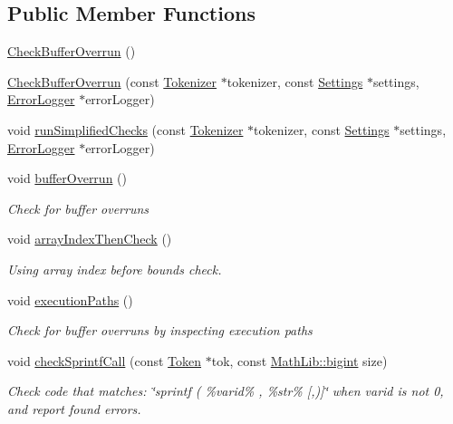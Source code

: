 \subsection*{Public Member Functions}
\begin{DoxyCompactItemize}
\item 
\hyperlink{class_check_buffer_overrun_a1cb967e46fe74a25d76e1eddf89e50a5}{Check\-Buffer\-Overrun} ()
\item 
\hyperlink{class_check_buffer_overrun_a31106cd3941647bd0064d2c7f60e7f6d}{Check\-Buffer\-Overrun} (const \hyperlink{class_tokenizer}{Tokenizer} $\ast$tokenizer, const \hyperlink{class_settings}{Settings} $\ast$settings, \hyperlink{class_error_logger}{Error\-Logger} $\ast$error\-Logger)
\item 
void \hyperlink{class_check_buffer_overrun_af0b26b559bda17a0403231d73756bd81}{run\-Simplified\-Checks} (const \hyperlink{class_tokenizer}{Tokenizer} $\ast$tokenizer, const \hyperlink{class_settings}{Settings} $\ast$settings, \hyperlink{class_error_logger}{Error\-Logger} $\ast$error\-Logger)
\item 
void \hyperlink{class_check_buffer_overrun_a610709cc6a78494f9d87074fae823554}{buffer\-Overrun} ()
\begin{DoxyCompactList}\small\item\em Check for buffer overruns \end{DoxyCompactList}\item 
void \hyperlink{class_check_buffer_overrun_a81f504580129762e77ec0680fff447a2}{array\-Index\-Then\-Check} ()
\begin{DoxyCompactList}\small\item\em Using array index before bounds check. \end{DoxyCompactList}\item 
void \hyperlink{class_check_buffer_overrun_aab02af8a1f11d1f7443bb0ea10cd9409}{execution\-Paths} ()
\begin{DoxyCompactList}\small\item\em Check for buffer overruns by inspecting execution paths \end{DoxyCompactList}\item 
void \hyperlink{class_check_buffer_overrun_a09a7c952ced17dea7170e56165e88961}{check\-Sprintf\-Call} (const \hyperlink{class_token}{Token} $\ast$tok, const \hyperlink{class_math_lib_aea370b3be964c5704b6244d757fcac99}{Math\-Lib\-::bigint} size)
\begin{DoxyCompactList}\small\item\em Check code that matches\-: \char`\"{}sprintf ( \%varid\% , \%str\% \mbox{[},)\mbox{]}\char`\"{} when varid is not 0, and report found errors. \end{DoxyCompactList}\item 

\end{DoxyCompactItemize}
